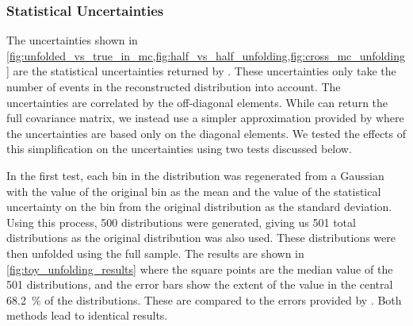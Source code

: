 \subsubsection{Statistical Uncertainties}
\label{ssec:unfolding_statistical_uncertainties}

The uncertainties shown in
\cref{fig:unfolded_vs_true_in_mc,fig:half_vs_half_unfolding,fig:cross_mc_unfolding}
are the statistical uncertainties returned by \RooUnfold. These uncertainties
only take the number of events in the reconstructed distribution into account.
The uncertainties are correlated by the off-diagonal elements. While \RooUnfold
can return the full covariance matrix, we instead use a simpler approximation
provided by \RooUnfold where the uncertainties are based only on the diagonal
elements. We tested the effects of this simplification on the uncertainties
using two tests discussed below.

In the first test, each bin in the \POWHEG \phistar distribution was
regenerated from a Gaussian with the value of the original bin as the mean and
the value of the statistical uncertainty on the bin from the original
distribution as the standard deviation. Using this process, \num{500} \phistar
distributions were generated, giving us \num{501} total distributions as the
original distribution was also used. These distributions were then unfolded
using the full \MADGRAPH sample. The results are shown in
\cref{fig:toy_unfolding_results} where the square points are the median value
of the 501 distributions, and the error bars show the extent of the value in
the central \SI{68.2}{\percent} of the distributions. These are compared to the
errors provided by \RooUnfold. Both methods lead to identical results.

